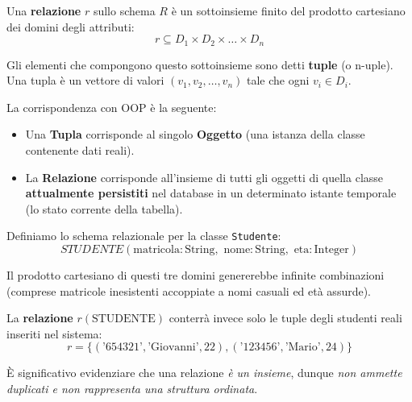 Una \textbf{relazione} $r$ sullo schema $R$ è un sottoinsieme finito del prodotto cartesiano dei domini degli attributi:
$$r \subseteq D_1 \times D_2 \times \dots \times D_n$$

Gli elementi che compongono questo sottoinsieme sono detti \textbf{tuple} (o n-uple). Una tupla è un vettore di valori $(v_1, v_2, \dots, v_n)$ tale che ogni $v_i \in D_i$.

\begin{tip}[]
La corrispondenza con OOP è la seguente:
\begin{itemize}
    \item Una \textbf{Tupla} corrisponde al singolo \textbf{Oggetto} (una istanza della classe contenente dati reali).
    \item La \textbf{Relazione} corrisponde all'insieme di tutti gli oggetti di quella classe \textbf{attualmente persistiti} nel database in un determinato istante temporale (lo stato corrente della tabella).
\end{itemize}
\end{tip}

\begin{example}
Definiamo lo schema relazionale per la classe \texttt{Studente}:
$$STUDENTE(\text{matricola}: \text{String}, \text{ nome}: \text{String}, \text{ eta}: \text{Integer})$$

Il prodotto cartesiano di questi tre domini genererebbe infinite combinazioni (comprese matricole inesistenti accoppiate a nomi casuali ed età assurde). 

La \textbf{relazione} $r(\text{STUDENTE})$ conterrà invece solo le tuple degli studenti reali inseriti nel sistema:
$$r = \{(\text{'654321'}, \text{'Giovanni'}, 22), (\text{'123456'}, \text{'Mario'}, 24)\}$$
\end{example}

\begin{observation}
    È significativo evidenziare che una relazione \textit{è un insieme}, dunque \textit{non ammette duplicati e non rappresenta una struttura ordinata}. 
\end{observation}

